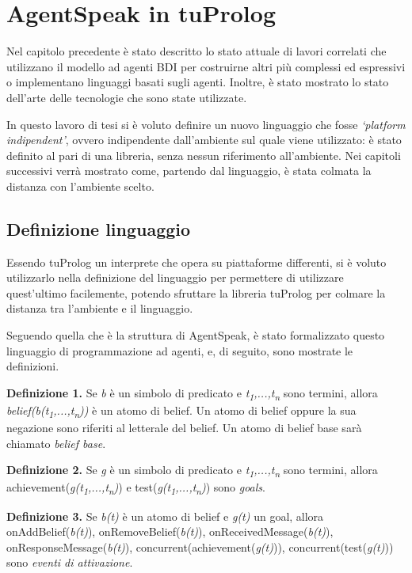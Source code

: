 \chapter{AgentSpeak in tuProlog}
Nel capitolo precedente \`e stato descritto lo stato attuale di lavori correlati che utilizzano il modello ad agenti BDI per costruirne altri pi\`u complessi ed espressivi o implementano linguaggi basati sugli agenti. Inoltre, \`e stato mostrato lo stato dell'arte delle tecnologie che sono state utilizzate.

In questo lavoro di tesi si \`e voluto definire un nuovo linguaggio che fosse \textit{`platform indipendent'}, ovvero indipendente dall'ambiente sul quale viene utilizzato: \`e stato definito al pari di una libreria, senza nessun riferimento all'ambiente. Nei capitoli successivi verr\`a mostrato come, partendo dal linguaggio, \`e stata colmata la distanza con l'ambiente scelto.

\section{Definizione linguaggio}
Essendo tuProlog un interprete che opera su piattaforme differenti, si \`e voluto utilizzarlo nella definizione del linguaggio per permettere di utilizzare quest'ultimo facilemente, potendo sfruttare la libreria tuProlog per colmare la distanza tra l'ambiente e il linguaggio.

Seguendo quella che \`e la struttura di AgentSpeak, \`e stato formalizzato questo linguaggio di programmazione ad agenti, e, di seguito, sono mostrate le definizioni.


\smallskip
\textbf{Definizione 1.} Se \textit{b} \`e un simbolo di predicato e \textit{t\textsubscript{1},...,t\textsubscript{n}} sono termini, allora \textit{belief(b(t\textsubscript{1},...,t\textsubscript{n}))} \`e un atomo di belief.
Un atomo di belief oppure la sua negazione sono riferiti al letterale del belief. Un atomo di belief base sar\`a chiamato \textit{belief base}.

\smallskip
\textbf{Definizione 2.} Se \textit{g} \`e un simbolo di predicato e \textit{t\textsubscript{1},...,t\textsubscript{n}} sono termini, allora achievement(\textit{g(t\textsubscript{1},...,t\textsubscript{n})}) e test(\textit{g(t\textsubscript{1},...,t\textsubscript{n})}) sono \textit{goals}.

\smallskip
\textbf{Definizione 3.} Se \textit{b(t)} \`e un atomo di belief e \textit{g(t)} un goal, allora onAddBelief(\textit{b(t)}), onRemoveBelief(\textit{b(t)}), onReceivedMessage(\textit{b(t)}), onResponseMessage(\textit{b(t)}), concurrent(achievement(\textit{g(t)})), concurrent(test(\textit{g(t)})) sono \textit{eventi di attivazione}.

